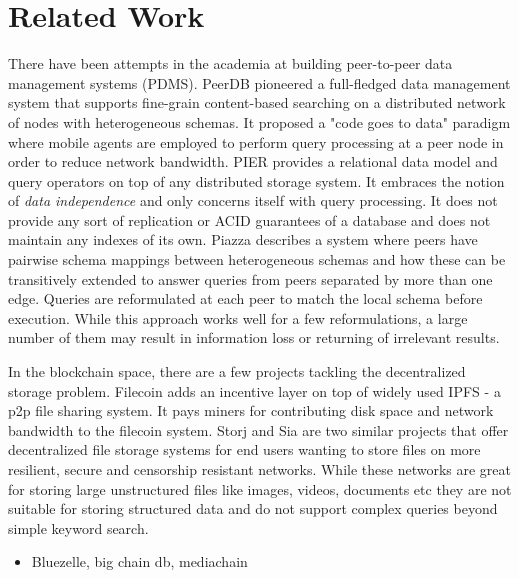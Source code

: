 \section{Related Work}
There have been attempts in the academia at building peer-to-peer data management systems (PDMS). PeerDB \cite{PeerDB} pioneered a full-fledged data management system that supports fine-grain content-based searching on a distributed network of nodes with heterogeneous schemas. It proposed a "code goes to data" paradigm where mobile agents are employed to perform query processing at a peer node in order to reduce network bandwidth. PIER \cite{PIER} provides a relational data model and query operators on top of any distributed storage system. It embraces the notion of \textit{data independence} and only concerns itself with query processing. It does not provide any sort of replication or ACID guarantees of a database and does not maintain any indexes of its own. Piazza \cite{Piazza} describes a system where peers have pairwise schema mappings between heterogeneous schemas and how these can be transitively extended to answer queries from peers separated by more than one edge. Queries are reformulated at each peer to match the local schema before execution. While this approach works well for a few reformulations, a large number of them may result in information loss or returning of irrelevant results.
\newline\newline


In the blockchain space, there are a few projects tackling the decentralized storage problem. Filecoin \cite{Filecoin}
adds an incentive layer on top of widely used IPFS \cite{ipfs} - a p2p file sharing system. It pays miners for
contributing disk space and network bandwidth to the filecoin system. Storj \cite{Storj} and Sia \cite{Sia} are two
similar projects that offer decentralized file storage systems for end users wanting to store files on more resilient,
secure and censorship resistant networks. While these networks are great for storing large unstructured files like
images, videos, documents etc they are not suitable for storing structured data and do not support complex queries
beyond simple keyword search.

    \begin{itemize}
        \item Bluezelle, big chain db, mediachain
    \end{itemize}


